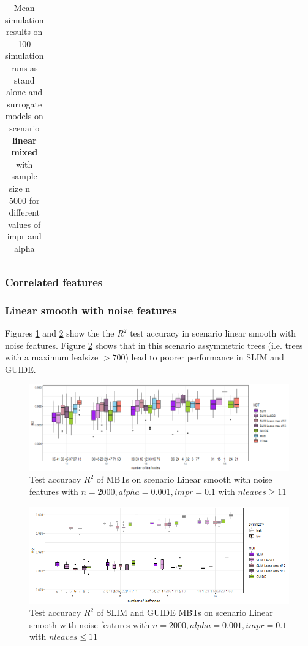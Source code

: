 \begin{table}[!htb]
\begin{tabular}[t]{l|l|r|r|r|r|r|r|r|r|r}
\end{tabular}
\caption{Mean simulation results on 100 simulation runs as stand alone and surrogate models on scenario \textbf{linear mixed} with sample size n = 5000 for different values of impr and alpha}
\label{tab:app_linear_mixed_5000}

\end{table}


\clearpage
\subsubsection{Correlated features}

\subsubsection{Linear smooth with noise features}
Figures \ref{fig:app_lasso_standalone_r2_test} and \ref{fig:app_lasso_standalone_r2_test_slim} show the the $R^2$ test accuracy in scenario linear smooth with noise features. Figure \ref{fig:app_lasso_standalone_r2_test_slim} shows that in this scenario assymmetric trees (i.e. trees with a maximum leafsize $> 700$) lead to poorer performance in SLIM and GUIDE.


\begin{figure}[!htb]
     \centering
     
    \includegraphics[width=16cm]{Figures/simulations/batchtools/lasso/lasso_standalone_r2_test.png}
    \caption{Test accuracy $R^2$ of MBTs on scenario Linear smooth with noise features with $n=2000, alpha = 0.001, impr = 0.1$ with $n leaves \geq 11$}
    \label{fig:app_lasso_standalone_r2_test}
\end{figure} 

\begin{figure}[!htb]
     \centering
    \includegraphics[width=16cm]{Figures/simulations/batchtools/lasso/lasso_standalone_r2_test_slim.png}
    \caption{Test accuracy $R^2$ of SLIM and GUIDE MBTs on scenario Linear smooth with noise features with $n=2000, alpha = 0.001, impr = 0.1$ with $n leaves \leq 11$}
\label{fig:app_lasso_standalone_r2_test_slim}
\end{figure} 

